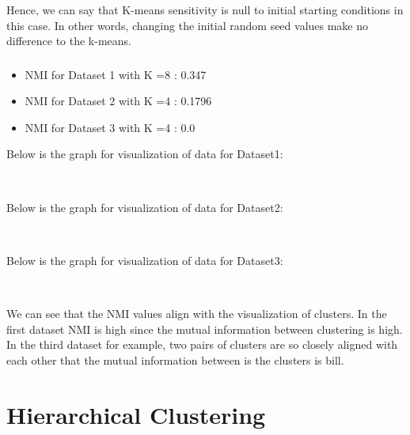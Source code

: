 \documentclass[11pt]{article}
\begin{document}
Hence, we can say that K-means sensitivity is null to initial starting
conditions in this case. In other words, changing the initial random
seed values make no difference to the k-means.\\

\subsubsection{}
\begin{itemize}
 \item   NMI for Dataset 1 with K =8 : 0.347 
 \item NMI for Dataset 2 with K =4 : 0.1796
\item NMI for Dataset 3 with K =4 : 0.0
\end{itemize}
    Below is the graph for visualization of data for Dataset1:

    \begin{center}
    \end{center}
    { \hspace*{\fill} \\}
    
    Below is the graph for visualization of data for Dataset2:

    \begin{center}
    \end{center}
    { \hspace*{\fill} \\}
    
      Below is the graph for visualization of data for Dataset3:
    \begin{center}
    \end{center}
    { \hspace*{\fill} \\}
   
  We can see that the NMI values align with the visualization of clusters. In the first dataset NMI is high since the mutual information between clustering is high.
  In the third dataset for example, two pairs of clusters are so closely aligned with each other that the mutual information between is the clusters is bill.
    
  \section{Hierarchical Clustering}
\end{document}
